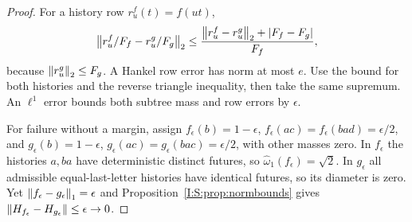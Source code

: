 \begin{proof}
For a history row $r_u^f(t)=f(ut)$,
\[
 \left\lVert r_u^f/F_f-r_u^g/F_g\right\rVert_2
 \le\frac{\left\lVert r_u^f-r_u^g\right\rVert_2+|F_f-F_g|}{F_f},
\]
because $\left\lVert r_u^g\right\rVert_2\le F_g$. A Hankel row error has norm at most $e$. Use the bound for both histories and the reverse triangle inequality, then take the same supremum. An $\ell^1$ error bounds both subtree mass and row errors by $\epsilon$.

For failure without a margin, assign $f_\epsilon(b)=1-\epsilon$, $f_\epsilon(ac)=f_\epsilon(bad)=\epsilon/2$, and $g_\epsilon(b)=1-\epsilon$, $g_\epsilon(ac)=g_\epsilon(bac)=\epsilon/2$, with other masses zero. In $f_\epsilon$ the histories $a,ba$ have deterministic distinct futures, so $\widehat\omega_1(f_\epsilon)=\sqrt2$. In $g_\epsilon$ all admissible equal-last-letter histories have identical futures, so its diameter is zero. Yet $\left\lVert f_\epsilon-g_\epsilon\right\rVert_1=\epsilon$ and Proposition~\ref{I:S:prop:normbounds} gives $\left\lVert H_{f_\epsilon}-H_{g_\epsilon}\right\rVert\le\epsilon\to0$.
\end{proof}
